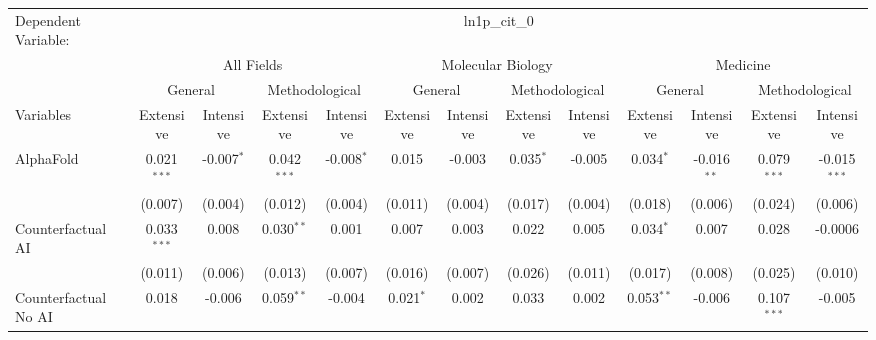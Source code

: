 \begingroup
\centering
\begin{tabular}{lcccccccccccc}
   \tabularnewline \midrule \midrule
   Dependent Variable: & \multicolumn{12}{c}{ln1p\_cit\_0}\\
 & \multicolumn{4}{c}{All Fields} & \multicolumn{4}{c}{Molecular Biology} & \multicolumn{4}{c}{Medicine} \\
\cmidrule(lr){2-5} \cmidrule(lr){6-9} \cmidrule(lr){10-13}
 & \multicolumn{2}{c}{General} & \multicolumn{2}{c}{Methodological} & \multicolumn{2}{c}{General} & \multicolumn{2}{c}{Methodological} & \multicolumn{2}{c}{General} & \multicolumn{2}{c}{Methodological} \\
\cmidrule(lr){2-3} \cmidrule(lr){4-5} \cmidrule(lr){6-7} \cmidrule(lr){8-9} \cmidrule(lr){10-11} \cmidrule(lr){12-13}
Variables & \multicolumn{1}{c}{Extensive} & \multicolumn{1}{c}{Intensive} & \multicolumn{1}{c}{Extensive} & \multicolumn{1}{c}{Intensive} & \multicolumn{1}{c}{Extensive} & \multicolumn{1}{c}{Intensive} & \multicolumn{1}{c}{Extensive} & \multicolumn{1}{c}{Intensive} & \multicolumn{1}{c}{Extensive} & \multicolumn{1}{c}{Intensive} & \multicolumn{1}{c}{Extensive} & \multicolumn{1}{c}{Intensive} \\
\cmidrule(lr){1-1}\cmidrule(lr){2-2} \cmidrule(lr){3-3} \cmidrule(lr){4-4} \cmidrule(lr){5-5} \cmidrule(lr){6-6} \cmidrule(lr){7-7} \cmidrule(lr){8-8} \cmidrule(lr){9-9} \cmidrule(lr){10-10} \cmidrule(lr){11-11} \cmidrule(lr){12-12} \cmidrule(lr){13-13}
   AlphaFold                                & 0.021$^{***}$ & -0.007$^{*}$ & 0.042$^{***}$ & -0.008$^{*}$ & 0.015       & -0.003         & 0.035$^{*}$ & -0.005         & 0.034$^{*}$  & -0.016$^{**}$ & 0.079$^{***}$ & -0.015$^{***}$\\   
                                            & (0.007)       & (0.004)      & (0.012)       & (0.004)      & (0.011)     & (0.004)        & (0.017)     & (0.004)        & (0.018)      & (0.006)       & (0.024)       & (0.006)\\   
   Counterfactual AI                        & 0.033$^{***}$ & 0.008        & 0.030$^{**}$  & 0.001        & 0.007       & 0.003          & 0.022       & 0.005          & 0.034$^{*}$  & 0.007         & 0.028         & -0.0006\\   
                                            & (0.011)       & (0.006)      & (0.013)       & (0.007)      & (0.016)     & (0.007)        & (0.026)     & (0.011)        & (0.017)      & (0.008)       & (0.025)       & (0.010)\\   
   Counterfactual No AI                     & 0.018         & -0.006       & 0.059$^{**}$  & -0.004       & 0.021$^{*}$ & 0.002          & 0.033       & 0.002          & 0.053$^{**}$ & -0.006        & 0.107$^{***}$ & -0.005\\   

\end{tabular}
